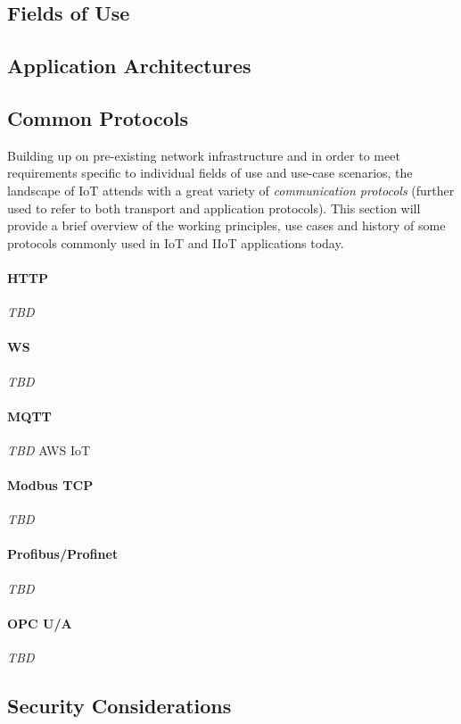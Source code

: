 \subsection{Fields of Use}
\subsection{Application Architectures}
\subsection{Common Protocols}
\label{sec:iot-common-protocols}
Building up on pre-existing network infrastructure and in order to meet requirements specific to individual fields of use and use-case scenarios, the landscape of \ac{IoT} attends with a great variety of \emph{communication protocols} (further used to refer to both transport and application protocols). This section will provide a brief overview of the working principles, use cases and history of some protocols commonly used in \ac{IoT} and \ac{IIoT} applications today.
\paragraph{\ac{HTTP}} \emph{TBD} %
\paragraph{\ac{WS}} \emph{TBD} %
\paragraph{\ac{MQTT}} \emph{TBD} \ac{AWS} \ac{IoT}%
\paragraph{Modbus \ac{TCP}} \emph{TBD} %
\paragraph{Profibus/Profinet} \emph{TBD} %
\paragraph{\ac{OPC U/A}} \emph{TBD} %

\subsection{Security Considerations}

